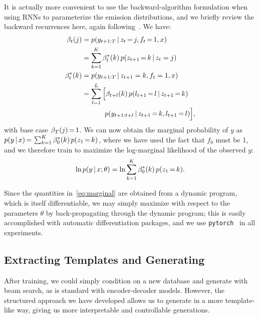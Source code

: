 \documentclass[11pt,a4paper]{article}
\begin{document}
It is actually more convenient to use the backward-algorithm formulation when using RNNs to parameterize the emission distributions, and we briefly review the backward recurrences here, again following~\citet{murphy2002hidden}. We have:
\begin{align*}
\beta_t(j) &= p(y_{t+1:T} \,|\, z_t \, {=} \, j, f_t \, {=} \, 1, x)\\
&= \sum_{k=1}^K \beta^{*}_t(k) \, p(z_{t+1} \, {=} \, k \,|\, z_t = j) \\
\beta^{*}_t(k) &= p(y_{t+1:T} \,|\, z_{t+1}=k, f_t=1, x)\\
&= \sum_{l=1}^L \Big[ \beta_{t+l}(k) \, p(l_{t+1} \, {=} \, l \,|\, z_{t+1} \, {=} \, k) \\ 
& \quad \quad \quad \; p(y_{t+1:t+l} \,|\, z_{t+1} \, {=} \, k, l_{t+1} \, {=} \, l) \Big], 
\end{align*}
with base case $\beta_T(j) \, {=} \, 1$. We can now obtain the marginal probability of $y$ as $p(y \,|\, x) \, {=} \, \sum_{k=1}^K \beta^{*}_0(k) \, p(z_1 \, {=} \, k)$,
where we have used the fact that $f_0$ must be 1, and we therefore train to maximize the log-marginal likelihood of the observed $y$:
\begin{align} \label{eq:marginal}
    \ln p(y \,|\, x; \theta) = \ln \sum_{k=1}^K \beta^{*}_0(k) \, p(z_1 \, {=} \, k).
\end{align}

Since the quantities in~\eqref{eq:marginal} are obtained from a dynamic program, which is itself differentiable, we may simply maximize with respect to the parameters $\theta$ by back-propagating through the dynamic program; this is easily accomplished with automatic differentiation packages, and we use \texttt{pytorch}~\citep{paszke2017automatic} in all experiments.

\subsection{Extracting Templates and Generating}
\label{sec:segmentation}
After training, we could simply condition on a new database and generate with beam search, as is standard with encoder-decoder models. However, the structured approach we have developed allows us to generate in a more template-like way, giving us more interpretable and controllable generations. 
\end{document}
